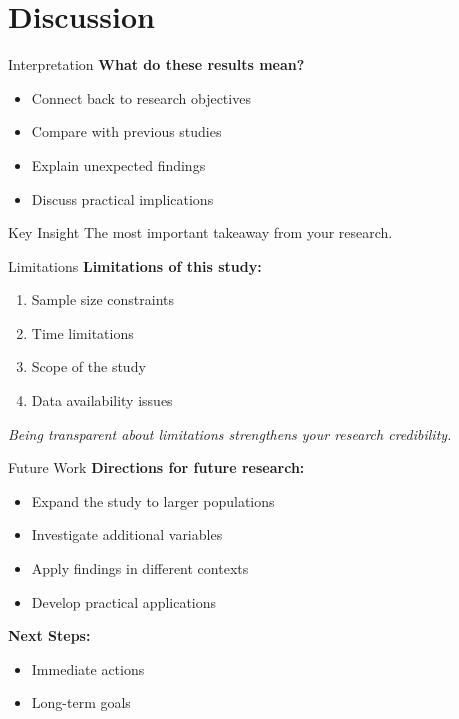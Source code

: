\documentclass[aspectratio=169]{beamer}
\begin{document}
	\section{Discussion}
	
	\begin{frame}{Interpretation}
		\textbf{What do these results mean?}
		
		\begin{itemize}
			\item Connect back to research objectives
			\item Compare with previous studies
			\item Explain unexpected findings
			\item Discuss practical implications
		\end{itemize}
		
		\vspace{1em}
		
		\begin{exampleblock}{Key Insight}
			The most important takeaway from your research.
		\end{exampleblock}
	\end{frame}
	
	\begin{frame}{Limitations}
		\textbf{Limitations of this study:}
		
		\begin{enumerate}
			\item Sample size constraints
			\item Time limitations
			\item Scope of the study
			\item Data availability issues
		\end{enumerate}
		
		\vspace{1em}
		
		\textit{Being transparent about limitations strengthens your research credibility.}
	\end{frame}
	
	\begin{frame}{Future Work}
		\textbf{Directions for future research:}
		
		\begin{itemize}
			\item Expand the study to larger populations
			\item Investigate additional variables
			\item Apply findings in different contexts
			\item Develop practical applications
		\end{itemize}
		
		\vspace{1em}
		
		\textbf{Next Steps:}
		\begin{itemize}
			\item Immediate actions
			\item Long-term goals
		\end{itemize}
	\end{frame}
	
\end{document}
